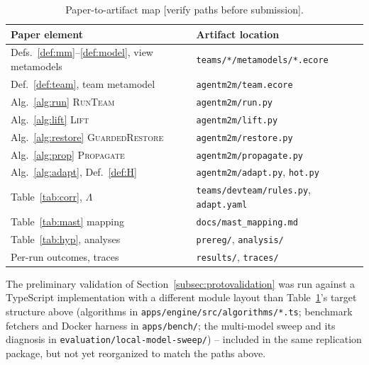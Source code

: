 \documentclass[10pt, anonymous, conference]{IEEEtran}
\theoremstyle{definition}
\theoremstyle{plain}
\theoremstyle{remark}
\newcommand{\code}[1]{\texttt{#1}}
\newcommand{\fixme}[1]{{\color{red}[#1]}}
\begin{document}
\begin{table}[t]
\centering
\caption{Paper-to-artifact map \fixme{verify paths before submission}.}
\label{tab:artifact}
\scriptsize
\setlength{\tabcolsep}{3pt}
\begin{tabular}{@{}p{} p{}@{}}
\toprule
Paper element & Artifact location \\
\midrule
Defs.~\ref{def:mm}--\ref{def:model}, view metamodels & \code{teams/*/metamodels/*.ecore} \\
Def.~\ref{def:team}, team metamodel      & \code{agentm2m/team.ecore} \\
Alg.~\ref{alg:run} \textsc{RunTeam}      & \code{agentm2m/run.py} \\
Alg.~\ref{alg:lift} \textsc{Lift}        & \code{agentm2m/lift.py} \\
Alg.~\ref{alg:restore} \textsc{GuardedRestore} & \code{agentm2m/restore.py} \\
Alg.~\ref{alg:prop} \textsc{Propagate}   & \code{agentm2m/propagate.py} \\
Alg.~\ref{alg:adapt}, Def.~\ref{def:H}   & \code{agentm2m/adapt.py}, \code{hot.py} \\
Table~\ref{tab:corr}, $\Lambda$          & \code{teams/devteam/rules.py}, \code{adapt.yaml} \\
Table~\ref{tab:mast} mapping             & \code{docs/mast\_mapping.md} \\
Table~\ref{tab:hyp}, analyses            & \code{prereg/}, \code{analysis/} \\
Per-run outcomes, traces                 & \code{results/}, \code{traces/} \\
\bottomrule
\end{tabular}
\end{table}

\noindent The preliminary validation of Section~\ref{subsec:protovalidation} was run against a TypeScript
implementation with a different module layout than Table~\ref{tab:artifact}'s target structure above
(algorithms in \code{apps/engine/src/algorithms/*.ts}; benchmark fetchers and Docker harness in
\code{apps/bench/}; the multi-model sweep and its diagnosis in \code{evaluation/local-model-sweep/}) --
included in the same replication package, but not yet reorganized to match the paths above.

\end{document}
